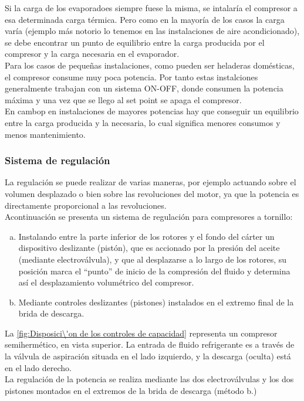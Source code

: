 Si la carga de los evaporadoes siempre fuese la misma, se intalar\'ia el compresor a esa determinada carga t\'ermica. Pero como en la mayor\'ia de los casos la carga var\'ia (ejemplo m\'as notorio lo tenemos en las instalaciones de aire acondicionado), se debe encontrar un punto de equilibrio entre la carga producida por el compresor y la carga necesaria en el evaporador.\\Para los casos de pequeñas instalaciones, como pueden ser heladeras dom\'esticas, el compresor consume muy poca potencia. Por tanto estas instalciones generalmente trabajan con un sistema ON-OFF, donde consumen la potencia m\'axima y una vez que se llego al set point se apaga el compresor.\\En cambop en instalaciones de mayores potencias hay que conseguir un equilibrio entre la carga producida y la necesaria, lo cual significa menores consumos y menos mantenimiento.

\subsubsection{Sistema de regulaci\'on}

La regulaci\'on se puede realizar de varias maneras, por ejemplo actuando sobre el volumen desplazado o bien sobre las revoluciones del motor, ya que la potencia es directamente proporcional a las revoluciones.\\Acontinuaci\'on se presenta un sistema de regulaci\'on para compresores a tornillo:

\begin{enumerate}[a.]
	\item Instalando entre la parte inferior de los rotores y el fondo del c\'arter un dispositivo deslizante (pist\'on), que es accionado por la presi\'on del aceite (mediante electrov\'alvula), y que al desplazarse a lo largo de los rotores, su posici\'on marca el ``punto'' de inicio de la compresi\'on del fluido y determina as\'i el desplazamiento volum\'etrico del compresor.
	\item Mediante controles deslizantes (pistones) instalados en el extremo final de la brida de descarga.
\end{enumerate}

La \autoref{fig:Disposici\'on de los controles de capacidad} representa un compresor semiherm\'etico, en vista superior. La entrada de fluido refrigerante es a trav\'es de la v\'alvula de aspiraci\'on situada en el lado izquierdo, y la descarga (oculta) est\'a en el lado derecho.\\La regulaci\'on de la potencia se realiza mediante las dos electrov\'alvulas y los dos pistones montados en el extremos de la brida de descarga (m\'etodo b.)

